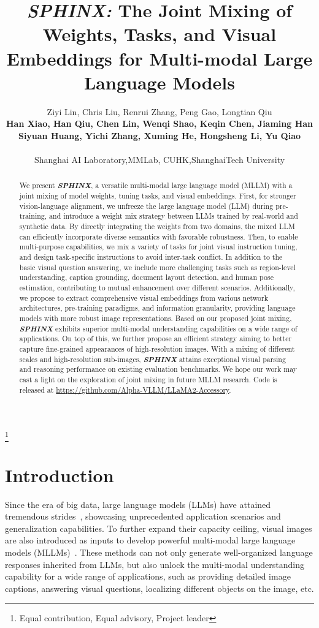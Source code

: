 \documentclass{article} \usepackage{iclr2024_conference,times}
\title{\textcolor{Goldenrod3}{\textit{\textbf{SPHINX:}}} The Joint Mixing of Weights, Tasks, and Visual Embeddings for Multi-modal Large Language Models}
\author{Ziyi Lin, Chris Liu, Renrui Zhang, Peng Gao, Longtian Qiu\vspace{0.1cm}\\
{\bf Han Xiao, Han Qiu, Chen Lin, Wenqi Shao, Keqin Chen, Jiaming Han}\vspace{0.1cm}\\
{\bf Siyuan Huang, Yichi Zhang, Xuming He, Hongsheng Li, Yu Qiao}\vspace{0.1cm}
\\ \\
Shanghai AI Laboratory,\quad MMLab, CUHK,\quad ShanghaiTech University
}
\newcommand\blfootnote[1]{\begingroup
  \renewcommand\thefootnote{}\footnote{#1}\addtocounter{footnote}{-1}\endgroup
}
\begin{document}
\maketitle
\blfootnote{ Equal contribution,  Equal advisory,  Project leader}

\begin{abstract}
We present \textcolor{Goldenrod3}{\textbf{\textit{SPHINX}}}, a versatile multi-modal large language model (MLLM) with a joint mixing of model weights, tuning tasks, and visual embeddings. 
First, for stronger vision-language alignment, we unfreeze the large language model (LLM) during pre-training, and introduce a weight mix strategy between LLMs trained by real-world and synthetic data. By directly integrating the weights from two domains, the mixed LLM can efficiently incorporate diverse semantics with favorable robustness.
Then, to enable multi-purpose capabilities, we mix a variety of tasks for joint visual instruction tuning, and design task-specific instructions to avoid inter-task conflict. In addition to the basic visual question answering, we include more challenging tasks such as region-level understanding, caption grounding, document layout detection, and human pose estimation, contributing to mutual enhancement over different scenarios. 
Additionally, we propose to extract comprehensive visual embeddings from various network architectures, pre-training paradigms, and information granularity, providing language models with more robust image representations.
Based on our proposed joint mixing, \textcolor{Goldenrod3}{\textbf{\textit{SPHINX}}} exhibits superior multi-modal understanding capabilities on a wide range of applications.
On top of this, we further propose an efficient strategy aiming to better capture fine-grained appearances of high-resolution images. With a mixing of different scales and high-resolution sub-images, \textcolor{Goldenrod3}{\textbf{\textit{SPHINX}}} attains exceptional visual parsing and reasoning performance on existing evaluation benchmarks. 
We hope our work may cast a light on the exploration of joint mixing in future MLLM research. Code is released at \url{https://github.com/Alpha-VLLM/LLaMA2-Accessory}.
\end{abstract}


\section{Introduction}
Since the era of big data, large language models (LLMs) have attained tremendous strides~\citep{OpenAI2023ChatGPT,OpenAI2023GPT4TR,brown2020language,touvron2023llama,zhang2022opt}, showcasing unprecedented application scenarios and generalization capabilities. To further expand their capacity ceiling, visual images are also introduced as inputs to develop powerful multi-modal large language models (MLLMs)~\citep{zhang2023llama,li2023blip,llava,zhu2023minigpt,zhao2023mmicl}. These methods can not only generate well-organized language responses inherited from LLMs, but also unlock the multi-modal understanding capability for a wide range of applications, such as providing detailed image captions, answering visual questions, localizing different objects on the image, etc.
\end{document}
